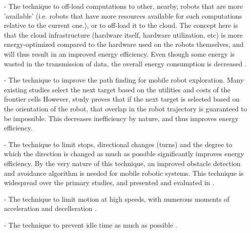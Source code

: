 \vspace{2mm}

- The technique to off-load computations to other, nearby, robots that are more 'available' 
(i.e. robots that have more resources available for such computations relative to the current one.), or to off-load it to the cloud.
The concept here is that the cloud infrastructure (hardware itself, hardware utilization, etc) is more energy-optimized compared to the
hardware used on the robots themselves, and will thus result in an improved energy efficiency.
Even though some energy is wasted in the transmission of data, the overall energy consumption is decreased \cite{rahman2019cloud_robot_offloading}.
    
\vspace{2mm}

- The technique to improve the path finding for mobile robot exploration. 
Many existing studies select the next target based on the utilities and costs of the frontier cells 
\cite{burgard2005multi_robot_exploration, simmons2000multi_robot_exploration,zlot2002multi_robot_exploration} 
However, study \cite{mei2006mobile_exploration} proves that if the next target is selected based on the orientation of the robot, 
that overlap in the robot trajectory is guaranteed to be impossible. This decreases inefficiency by nature, and thus improves energy 
efficiency.
    
\vspace{2mm}

- The technique to limit stops, directional changes (turns) and the degree to which the direction is changed as much as possible 
significantly improves energy efficiency. By the very nature of this technique, an improved obstacle detection and avoidance algorithm
is needed for mobile robotic systems. This technique is widespread over the primary studies, and presented and evaluated in 
\cite{xie2018mecanum_wheel, kim2016firefighting_robot, benkrid2016multi_robot_exploration, barili1995efficient_motion, 
jia2004grid_strategy_exploration, mei2005energy_consumers_identified, patel2012exploration_strategy}.
    
\vspace{2mm}

- The technique to limit motion at high speeds, with numerous moments of acceleration and decelleration
\cite{wingstrom2013robot_cell_scheduling}.
    
\vspace{2mm}

- The technique to prevent idle time as much as possible \cite{gurel2019industrial_robot_scheduling, 
kaitwanidvilai2020industrial_robot_cycle_time, wingstrom2013robot_cell_scheduling}.
    
